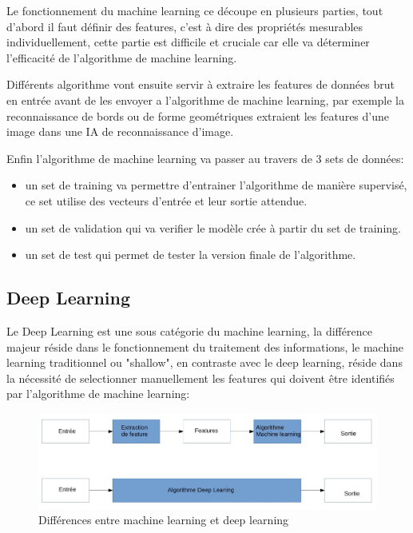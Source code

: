 Le fonctionnement du machine learning ce découpe en plusieurs parties,
tout d'abord il faut définir des features, c'est à dire des
propriétés mesurables individuellement, cette partie est difficile et cruciale
car elle va déterminer l'efficacité de l'algorithme de machine learning. \newline

Différents algorithme vont ensuite servir à extraire les features de données 
brut en entrée avant de les envoyer a l'algorithme de machine learning, par exemple 
la reconnaissance de bords ou de forme geométriques extraient les features d'une 
image dans une IA de reconnaissance d'image. \newline 

Enfin l'algorithme de machine learning va passer au travers de 3 sets de données:
\begin{itemize}
    \item un set de training va permettre d'entrainer l'algorithme de manière
     supervisé, ce set utilise des vecteurs d'entrée et leur sortie attendue.
    \item un set de validation qui va verifier le modèle crée à partir du set de 
    training.
    \item un set de test qui permet de tester la version finale de l'algorithme. 
\end{itemize}

\subsection{Deep Learning}
Le Deep Learning est une sous catégorie du machine learning, 
la différence majeur réside dans le fonctionnement du traitement des 
informations, le machine learning traditionnel ou "shallow", en contraste avec le deep learning,
réside dans la nécessité de selectionner manuellement les features qui doivent être 
identifiés par l'algorithme de machine learning:

\begin{figure}[!h]
    \centering
    \includegraphics[width=1\textwidth]{Images/MLvsDL}
    \caption{Différences entre machine learning et deep learning}
	\label{fig:categorieIA}
\end{figure}

